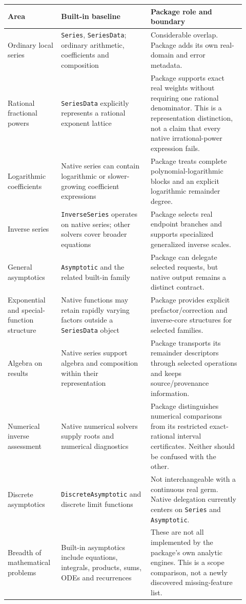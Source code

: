 \documentclass[11pt,letterpaper]{article}
\newcommand{\code}[1]{\texttt{#1}}
\begin{document}
\begin{longtable}{@{}P{0.20\linewidth}P{0.35\linewidth}P{0.37\linewidth}@{}}
\toprule
Area & Built-in baseline & Package role and boundary\\
\midrule\endhead
Ordinary local series & \code{Series}, \code{SeriesData}; ordinary arithmetic, coefficients and composition & Considerable overlap. Package adds its own real-domain and error metadata.~\cite{wl-series,wl-data,core}\\[5pt]
Rational fractional powers & \code{SeriesData} explicitly represents a rational exponent lattice & Package supports exact real weights without requiring one rational denominator. This is a representation distinction, not a claim that every native irrational-power expression fails.~\cite{wl-data,core}\\[5pt]
Logarithmic coefficients & Native series can contain logarithmic or slower-growing coefficient expressions & Package treats complete polynomial-logarithmic blocks and an explicit logarithmic remainder degree.~\cite{wl-data,core}\\[5pt]
Inverse series & \code{InverseSeries} operates on native series; other solvers cover broader equations & Package selects real endpoint branches and supports specialized generalized inverse scales.~\cite{wl-inverse,core,lambert}\\[5pt]
General asymptotics & \code{Asymptotic} and the related built-in family & Package can delegate selected requests, but native output remains a distinct contract.~\cite{wl-asymptotic,native}\\[5pt]
Exponential and special-function structure & Native functions may retain rapidly varying factors outside a \code{SeriesData} object & Package provides explicit prefactor/correction and inverse-core structures for selected families.~\cite{wl-data,modules}\\[5pt]
Algebra on results & Native series support algebra and composition within their representation & Package transports its remainder descriptors through selected operations and keeps source/provenance information.~\cite{wl-data,core}\\[5pt]
Numerical inverse assessment & Native numerical solvers supply roots and numerical diagnostics & Package distinguishes numerical comparisons from its restricted exact-rational interval certificates. Neither should be confused with the other.~\cite{core,compat}\\[5pt]
Discrete asymptotics & \code{DiscreteAsymptotic} and discrete limit functions & Not interchangeable with a continuous real germ. Native delegation currently centers on \code{Series} and \code{Asymptotic}.~\cite{wl-discrete,native}\\[5pt]
Breadth of mathematical problems & Built-in asymptotics include equations, integrals, products, sums, ODEs and recurrences & These are not all implemented by the package's own analytic engines. This is a scope comparison, not a newly discovered missing-feature list.~\cite{wl-guide,modules,intake}\\
\bottomrule
\end{longtable}
\end{document}
